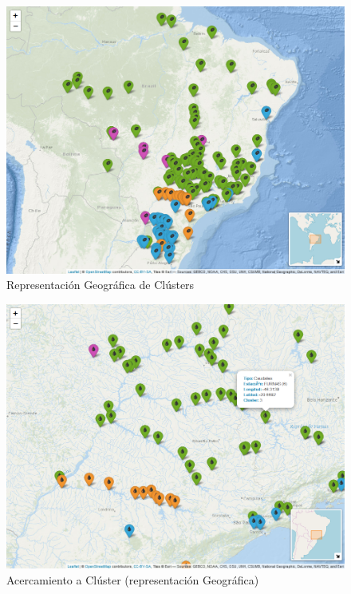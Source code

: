 \documentclass[12pt,oneside]{book}\usepackage[]{graphicx}\usepackage[]{color}
\theoremstyle{definition} %
\begin{document}
\begin{enumerate}
\begin{figure}[H]
\centering
\includegraphics[scale=0.45]{Resultados/3_mapa_clusters}
\caption{Representación Geográfica de Clústers}\label{fig:mapa}
\end{figure}


\begin{figure}[H]
\centering
\includegraphics[scale=0.55]{Resultados/3_mapa_zoom}
\caption{Acercamiento a Clúster (representación Geográfica)}\label{fig:mapa_zoom}
\end{figure}




\end{enumerate}
\end{document}
